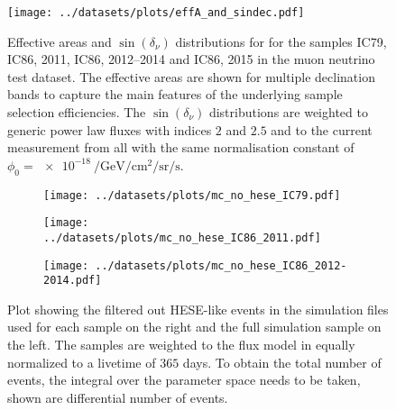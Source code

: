 \begin{figure}[H]
  \centering
  \texttt{[image: ../datasets/plots/effA\_and\_sindec.pdf]}
  \caption[Effective areas and $\sin(\delta_\nu)$ distributions]{
    Effective areas and $\sin(\delta_\nu)$ distributions for for the samples IC79, IC86, 2011, IC86, 2012--2014 and IC86, 2015 in the muon neutrino test dataset.
    The effective areas are shown for multiple declination bands to capture the main features of the underlying sample selection efficiencies.
    The $\sin(\delta_\nu)$ distributions are weighted to generic power law fluxes with indices $2$ and $2.5$ and to the current measurement from \cite{Haack:2017dxi} all with the same normalisation constant of $\phi_0 = \SI[per-mode=reciprocal]{e-18}{\per\GeV\per\cm\squared\per\steradian\per\second}$.
    }
  \label{fig:effA_and_sindec}
\end{figure}

\begin{figure}[H]
  \centering
  \begin{subfigure}[t]{\textwidth}
    \centering
    \texttt{[image: ../datasets/plots/mc\_no\_hese\_IC79.pdf]}
  \end{subfigure}
  \hfill
  \begin{subfigure}[t]{\textwidth}
    \centering
    \texttt{[image: ../datasets/plots/mc\_no\_hese\_IC86\_2011.pdf]}
  \end{subfigure}
  \hfill
  \begin{subfigure}[t]{\textwidth}
    \centering
    \texttt{[image: ../datasets/plots/mc\_no\_hese\_IC86\_2012-2014.pdf]}
  \end{subfigure}
  \caption[HESE decorrelation for IC79, IC86'11 and IC86'12--'14]{
    Plot showing the filtered out HESE-like events in the simulation files used for each sample on the right and the full simulation sample on the left.
    The samples are weighted to the flux model in \cite{Haack:2017dxi} equally normalized to a livetime of $365$ days.
    To obtain the total number of events, the integral over the parameter space needs to be taken, shown are differential number of events.
    }
  \label{fig:mc_no_hese_79_86I_86II}
\end{figure}


